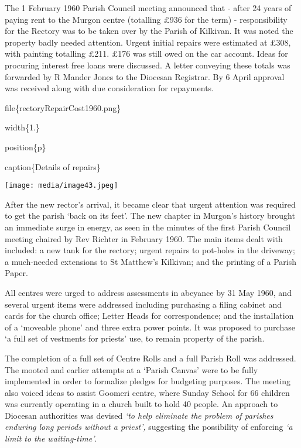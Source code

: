 The 1 February 1960 Parish Council meeting announced that - after 24 years of paying rent to the Murgon centre (totalling £936 for the term) - responsibility for the Rectory was to be taken over by the Parish of Kilkivan. It was noted the property badly needed attention. Urgent initial repairs were estimated at £308, with painting totalling £211. £176 was still owed on the car account. Ideas for procuring interest free loans were discussed. A letter conveying these totals was forwarded by R Mander Jones to the Diocesan Registrar. By 6 April approval was received along with due consideration for repayments.

file\{rectoryRepairCost1960.png\}

width\{1.\}

position\{p\}

caption\{Details of repairs\}

\texttt{[image: media/image43.jpeg]}

After the new rector's arrival, it became clear that urgent attention was required to get the parish `back on its feet'. The new chapter in Murgon's history brought an immediate surge in energy, as seen in the minutes of the first Parish Council meeting chaired by Rev Richter in February 1960. The main items dealt with included: a new tank for the rectory; urgent repairs to pot-holes in the driveway; a much-needed extensions to St Matthew's Kilkivan; and the printing of a Parish Paper.

All centres were urged to address assessments in abeyance by 31 May 1960, and several urgent items were addressed including purchasing a filing cabinet and cards for the church office; Letter Heads for correspondence; and the installation of a `moveable phone' and three extra power points. It was proposed to purchase `a full set of vestments for priests' use, to remain property of the parish.

The completion of a full set of Centre Rolls and a full Parish Roll was addressed. The mooted and earlier attempts at a `Parish Canvas' were to be fully implemented in order to formalize pledges for budgeting purposes. The meeting also voiced ideas to assist Goomeri centre, where Sunday School for 66 children was currently operating in a church built to hold 40 people. An approach to Diocesan authorities was devised \emph{`to help eliminate the problem of parishes enduring long periods without a priest',} suggesting the possibility of enforcing \emph{`a limit to the waiting-time'}.

